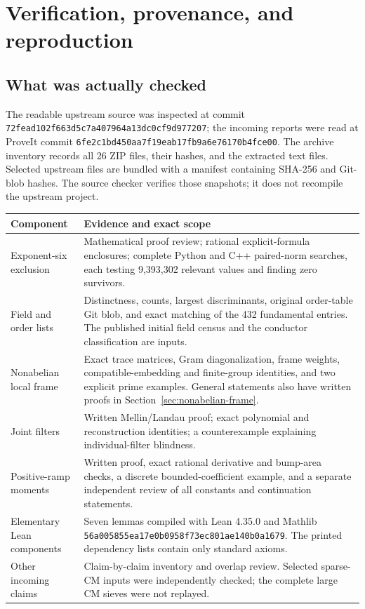 \section{Verification, provenance, and reproduction}
\label{sec:reproduction}

\subsection{What was actually checked}

The readable upstream source was inspected at commit
\nolinkurl{72fead102f663d5c7a407964a13dc0cf9d977207}; the incoming reports were read at ProveIt commit
\nolinkurl{6fe2c1bd450aa7f19eab17fb9a6e76170b4fce00}. The archive inventory records all 26 ZIP files, their hashes, and the extracted text files. Selected upstream files are bundled with a manifest containing SHA-256 and Git-blob hashes. The source checker verifies those snapshots; it does not recompile the upstream project.

\begin{longtable}{@{}p{}p{}@{}}
\toprule
Component & Evidence and exact scope\\
\midrule
\endhead
Exponent-six exclusion & Mathematical proof review; rational explicit-formula enclosures; complete Python and C++ paired-norm searches, each testing 9,393,302 relevant values and finding zero survivors.\\[4pt]
Field and order lists & Distinctness, counts, largest discriminants, original order-table Git blob, and exact matching of the 432 fundamental entries. The published initial field census and the conductor classification are inputs.\\[4pt]
Nonabelian local frame & Exact trace matrices, Gram diagonalization, frame weights, compatible-embedding and finite-group identities, and two explicit prime examples. General statements also have written proofs in Section~\ref{sec:nonabelian-frame}.\\[4pt]
Joint filters & Written Mellin/Landau proof; exact polynomial and reconstruction identities; a counterexample explaining individual-filter blindness.\\[4pt]
Positive-ramp moments & Written proof, exact rational derivative and bump-area checks, a discrete bounded-coefficient example, and a separate independent review of all constants and continuation statements.\\[4pt]
Elementary Lean components & Seven lemmas compiled with Lean 4.35.0 and Mathlib \texttt{56a005855ea17e0b0958f73ec801ae140b0a1679}. The printed dependency lists contain only standard axioms.\\[4pt]
Other incoming claims & Claim-by-claim inventory and overlap review. Selected sparse-CM inputs were independently checked; the complete large CM sieves were not replayed.\\
\bottomrule
\end{longtable}

